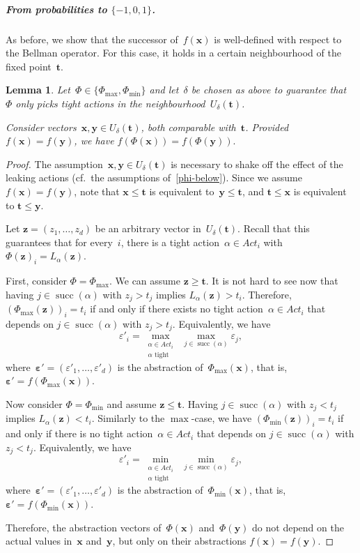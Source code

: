 \documentclass[preprint,12pt]{elsarticle}
\theoremstyle{plain}
\newtheorem{lemma}[theorem]{Lemma}
\theoremstyle{definition}
\theoremstyle{remark}
\theoremstyle{claimstyle}
\newcommand{\eps}{\bm{\varepsilon}}
\DeclareMathOperator*{\suc}{succ}
\begin{document}
\subparagraph*{From probabilities to $\{-1,0,1\}$.} 
As before, we show that the successor of~$f(\bm{x})$ is well-defined with respect to the Bellman operator.
For this case, it holds in a certain neighbourhood of the fixed point~$\bm{t}$. 
\begin{lemma}\label{abstr-with-tight}
Let~$\Phi \in \{\Phi_{\max},\Phi_{\min}\}$ and let~$\delta$ be chosen as above
to guarantee that~$\Phi$ only picks tight actions in the neighbourhood~$U_\delta(\bm{t})$.

Consider vectors~$\bm{x},\bm{y} \in U_\delta(\bm{t})$, both comparable with~$\bm{t}$.
Provided $f(\bm{x}) = f(\bm{y})$, we have
\(f(\Phi(\bm{x})) = f(\Phi(\bm{y})).\)
\end{lemma}
\begin{proof}
The assumption~$\bm{x}, \bm{y} \in U_\delta(\bm{t})$ is necessary to shake off the effect of the leaking actions (cf.\ the assumptions of~\cref{phi-below}).
Since we assume $f(\bm{x}) = f(\bm{y})$, 
	note that $\bm{x} \leq \bm{t}$ is equivalent to~$\bm{y} \leq \bm{t}$,
	and $\bm{t} \leq \bm{x}$ is equivalent to $\bm{t} \leq \bm{y}$.

Let $\bm{z} = (z_1, \dots, z_d)$ be an arbitrary vector in~$U_\delta(\bm{t})$.
Recall that this guarantees that for every~$i$, there is a tight action~$\alpha \in Act_i$ with 
$\Phi(\bm{z})_i = L_\alpha(\bm{z})$.

First, consider $\Phi = \Phi_{\max}$. We can assume $\bm{z} \geq \bm{t}$. 
It is not hard to see now that
having $j \in \suc(\alpha)$ with $z_j > t_j$ implies $L_\alpha(\bm{z}) > t_i$.
Therefore, $(\Phi_{\max}(\bm{z}))_i = t_i$ if and only if there exists no tight action~$\alpha \in Act_i$ that depends on
$j \in \suc(\alpha)$ with $z_j > t_j$.
Equivalently, we have
\begin{equation}\label{eq:phi-above}
	\varepsilon'_i = \max_{\substack{\alpha \in Act_i \\ \alpha \text{ tight}}} \; \max_{j \in \suc(\alpha)} \varepsilon_j,
\end{equation}
where~$\eps' = (\varepsilon'_1, \dots, \varepsilon'_d)$ is the abstraction of~$\Phi_{\max}(\bm{x})$, that is, $\eps' = f(\Phi_{\max}(\bm{x}))$.


Now consider $\Phi = \Phi_{\min}$ and assume $\bm{z} \leq \bm{t}$.
	Having $j \in \suc(\alpha)$ with $z_j < t_j$ implies $L_\alpha(\bm{z}) < t_i$.
Similarly to the $\max$-case, we have $(\Phi_{\min}(\bm{z}))_i = t_i$ if and only if there is no tight action~$\alpha \in Act_i$ that depends on
$j \in \suc(\alpha)$ with $z_j < t_j$.
Equivalently, we have
\begin{equation}\label{eq:psi-below}
	\varepsilon'_i = \min_{\substack{\alpha \in Act_i \\ \alpha \text{ tight}}} \; \min_{j \in \suc(\alpha)} \varepsilon_j,
\end{equation}
where~$\eps' = (\varepsilon'_1, \dots, \varepsilon'_d)$ is the abstraction of~$\Phi_{\min}(\bm{x})$, that is, $\eps' = f(\Phi_{\min}(\bm{x}))$.
	
Therefore, the abstraction vectors of~$\Phi(\bm{x})$ and~$\Phi(\bm{y})$ do not depend on the actual values in~$\bm{x}$ and~$\bm{y}$, but only on their abstractions $f(\bm{x}) = f(\bm{y})$.
\end{proof}
\end{document}
